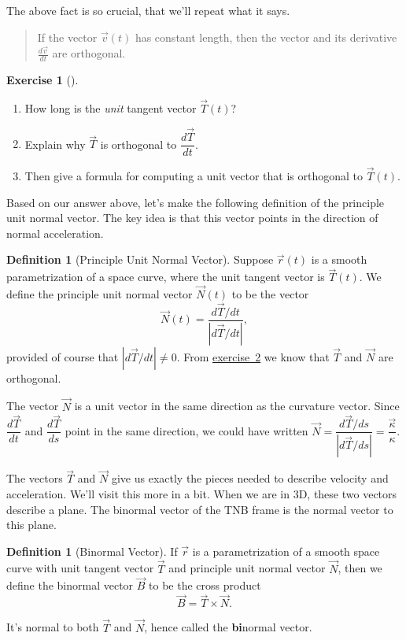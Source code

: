 \documentclass[10pt,]{book}
\newcommand{\terminology}[1]{\textbf{#1}}
\theoremstyle{plain}
\theoremstyle{definition}
\newtheorem{definition}[theorem]{Definition}
\theoremstyle{definition}
\theoremstyle{definition}
\theoremstyle{definition}
\newtheorem{exploration}[project]{Exercise}
\theoremstyle{definition}
\numberwithin{equation}{section}
\newcommand{\ds}{\displaystyle}
\begin{document}
The above fact is so crucial, that we'll repeat what it says.%
\begin{quote}\hypertarget{blockquote-4}{}
If the vector \(\vec v(t)\) has constant length, then the vector and its derivative \(\frac{d\vec v}{dt}\) are orthogonal.\end{quote}
\begin{exploration}[]\label{T_and_N_are_orthogonal}
\leavevmode%
\begin{enumerate}[font=\bfseries,label=(\alph*),ref=\alph*]
\item\label{task-435} How long is the \emph{unit} tangent vector \(\vec T(t)\)?%
\item\label{task-436} Explain why \(\vec T\) is orthogonal to \(\dfrac{d\vec T}{dt}\).%
\item\label{task-437} Then give a formula for computing a unit vector that is orthogonal to \(\vec T(t)\).%
\end{enumerate}
\end{exploration}
Based on our answer above, let's make the following definition of the principle unit normal vector. The key idea is that this vector points in the direction of normal acceleration.%
\begin{definition}[{Principle Unit Normal Vector}]\label{definition-28}
Suppose \(\vec r(t)\) is a smooth parametrization of a space curve, where the unit tangent vector is \(\vec T(t)\). We define the principle unit normal vector \(\vec N(t)\) to be the vector%
\begin{equation*}
\vec N(t) = \ds\frac{d\vec T/dt}{|d\vec T/dt|},
\end{equation*}
provided of course that \(|d\vec T/dt|\neq 0\). From \hyperref[T_and_N_are_orthogonal]{exercise~2} we know that \(\vec T\) and \(\vec N\) are orthogonal.%
\end{definition}
The vector \(\vec N\) is a unit vector in the same direction as the curvature vector. Since \(\dfrac{d\vec T}{dt}\) and \(\dfrac{d\vec T}{ds}\) point in the same direction, we could have written \(\vec N = \dfrac{d\vec T/ds}{|d\vec T/ds|} = \dfrac{\vec \kappa}{\kappa}\).%
\par
The vectors \(\vec T\) and \(\vec N\) give us exactly the pieces needed to describe velocity and acceleration. We'll visit this more in a bit. When we are in 3D, these two vectors describe a plane. The binormal vector of the TNB frame is the normal vector to this plane.%
\begin{definition}[{Binormal Vector}]\label{definition-29}
If \(\vec r\) is a parametrization of a smooth space curve with unit tangent vector \(\vec T\) and principle unit normal vector \(\vec N\), then we define the binormal vector \(\vec B\) to be the cross product%
\begin{equation*}
\vec B = \vec T\times \vec N.
\end{equation*}
%
\par
It's normal to both \(\vec T\) and \(\vec N\), hence called the \terminology{bi}normal vector.%
\end{definition}
\end{document}

